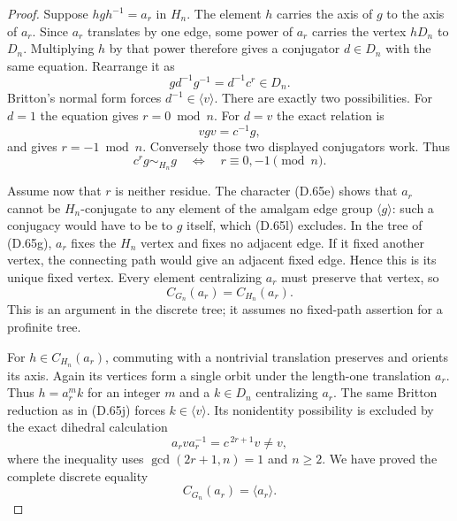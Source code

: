 \begin{proof}
Suppose $hgh^{-1}=a_r$ in $H_n$.
The element $h$ carries the axis of $g$ to the axis
of $a_r$. Since $a_r$ translates by one edge, some
power of $a_r$ carries the vertex $hD_n$ to $D_n$.
Multiplying $h$ by that power therefore gives a
conjugator $d\in D_n$ with the same equation.
Rearrange it as
\[
                  g d^{-1}g^{-1}=d^{-1}c^r\in D_n.
                                                               \tag{D.65j}
\]
Britton's normal form forces
$d^{-1}\in\langle v\rangle$.
There are exactly two possibilities.
For $d=1$ the equation gives $r=0\bmod n$.
For $d=v$ the exact relation is
\[
                   vgv=c^{-1}g,
                                                               \tag{D.65k}
\]
and gives $r=-1\bmod n$.
Conversely those two displayed conjugators work.
Thus
\[
           c^rg\sim_{H_n}g
          \quad\Longleftrightarrow\quad
                      r\equiv0,-1\pmod n.                   \tag{D.65l}
\]

Assume now that $r$ is neither residue.
The character (D.65e) shows that $a_r$ cannot be
$H_n$-conjugate to any element of the amalgam edge
group $\langle g\rangle$: such a conjugacy would
have to be to $g$ itself, which (D.65l) excludes.
In the tree of (D.65g), $a_r$ fixes the $H_n$ vertex
and fixes no adjacent edge. If it fixed another
vertex, the connecting path would give an adjacent
fixed edge. Hence this is its unique fixed vertex.
Every element centralizing $a_r$ must preserve that
vertex, so
\[
                        C_{G_n}(a_r)=C_{H_n}(a_r).
                                                               \tag{D.65m}
\]
This is an argument in the discrete tree; it assumes
no fixed-path assertion for a profinite tree.

For $h\in C_{H_n}(a_r)$, commuting with a nontrivial
translation preserves and orients its axis.
Again its vertices form a single orbit under the
length-one translation $a_r$.
Thus $h=a_r^m k$ for an integer $m$ and a
$k\in D_n$ centralizing $a_r$.
The same Britton reduction as in (D.65j) forces
$k\in\langle v\rangle$.
Its nonidentity possibility is excluded by the
exact dihedral calculation
\[
              a_r v a_r^{-1}=c^{\,2r+1}v\ne v,
                                                               \tag{D.65n}
\]
where the inequality uses $\gcd(2r+1,n)=1$ and
$n\geq2$.
We have proved the complete discrete equality
\[
                         C_{G_n}(a_r)=\langle a_r\rangle .
                                                               \tag{D.65o}
\]


\end{proof}
